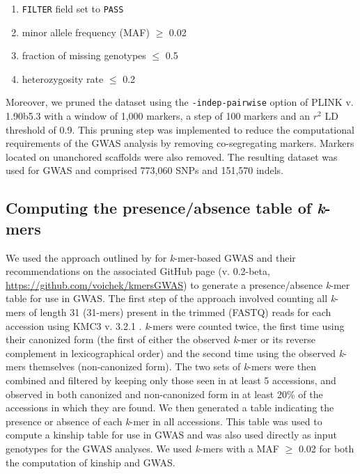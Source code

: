 \begin{enumerate}
	\item \texttt{FILTER} field set to \texttt{PASS}
	\item minor allele frequency (MAF) $\geq$ 0.02
	\item fraction of missing genotypes $\leq$ 0.5
	\item heterozygosity rate $\leq$ 0.2
\end{enumerate}

Moreover, we pruned the dataset using the \texttt{-\-indep-pairwise} option of
PLINK v. 1.90b5.3 \citep{purcell2007} with a window of 1,000 markers, a
step of 100 markers and an $r^2$ LD threshold of 0.9. This pruning step was
implemented to reduce the computational requirements of the GWAS analysis by
removing co-segregating markers. Markers located on unanchored scaffolds were
also removed. The resulting dataset was used for GWAS and comprised 773,060
SNPs and 151,570 indels.

\subsection*{Computing the presence/absence table of \emph{k}-mers}
\label{sv-gwas-kmer-pav}

We used the approach outlined by \cite{voichek2020} for \emph{k}-mer-based GWAS
and their recommendations on the
associated GitHub page (v. 0.2-beta, \url{https://github.com/voichek/kmersGWAS}) to generate
a presence/absence \emph{k}-mer table for use in GWAS.  The first step of
the approach involved counting all \emph{k}-mers of length 31 (31-mers) present
in the trimmed (FASTQ) reads for each accession using KMC3 v. 3.2.1
\citep{kokot2017}. \emph{k}-mers were counted twice, the first time using their
canonized form (the first of either the observed \textit{k}-mer or its reverse
complement in lexicographical order) and the second time using the observed
\emph{k}-mers themselves (non-canonized form). The two sets of \textit{k}-mers
were then combined and filtered by
keeping only those seen in at least 5 accessions, and observed in both canonized
and non-canonized form in at least 20\% of the accessions in which they are found.
We then generated a table indicating the presence or absence of each
\emph{k}-mer in all accessions. This table was used to compute a kinship
table for use in GWAS and was also used directly as input genotypes for the
GWAS analyses. We used \emph{k}-mers with a MAF $\geq$ 0.02 for both the
computation of kinship and GWAS.

